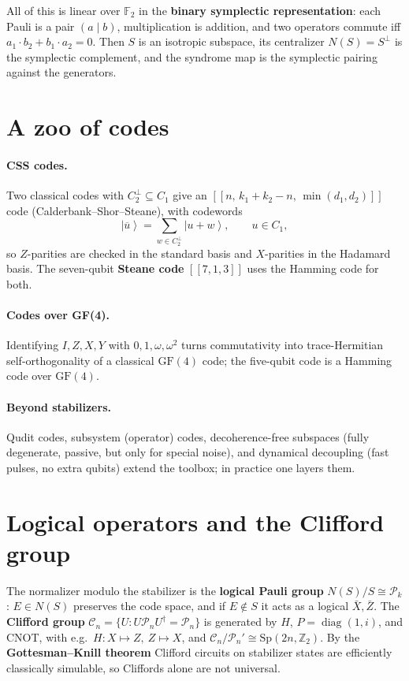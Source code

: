 \documentclass[11pt]{article}
\newcommand{\ket}[1]{\left|#1\right\rangle}
\DeclareMathOperator{\diag}{diag}
\theoremstyle{plain}
\begin{document}
\noindent All of this is linear over $\mathbb F_2$ in the \textbf{binary symplectic representation}:
each Pauli is a pair $(a\mid b)$, multiplication is addition, and two operators commute iff
$a_1\!\cdot\!b_2 + b_1\!\cdot\!a_2 = 0$. Then $S$ is an isotropic subspace, its centralizer
$N(S)=S^\perp$ is the symplectic complement, and the syndrome map is the symplectic pairing against
the generators.

\section{A zoo of codes}
\paragraph{CSS codes.} Two classical codes with $C_2^\perp\subseteq C_1$ give an
$[[n,\,k_1+k_2-n,\,\min(d_1,d_2)]]$ code (Calderbank--Shor--Steane), with codewords
\[ \ket{\overline{u}} = \sum_{w\in C_2^\perp}\ket{u+w},\qquad u\in C_1, \]
so $Z$-parities are checked in the standard basis and $X$-parities in the Hadamard basis. The
seven-qubit \textbf{Steane code} $[[7,1,3]]$ uses the Hamming code for both.

\paragraph{Codes over GF(4).} Identifying $I,Z,X,Y$ with $0,1,\omega,\omega^2$ turns commutativity into
trace-Hermitian self-orthogonality of a classical $\mathrm{GF}(4)$ code; the five-qubit code is a
Hamming code over $\mathrm{GF}(4)$.

\paragraph{Beyond stabilizers.} Qudit codes, subsystem (operator) codes, decoherence-free subspaces
(fully degenerate, passive, but only for special noise), and dynamical decoupling (fast pulses, no
extra qubits) extend the toolbox; in practice one layers them.

\section{Logical operators and the Clifford group}
The normalizer modulo the stabilizer is the \textbf{logical Pauli group} $N(S)/S \cong \mathcal P_k$:
$E\in N(S)$ preserves the code space, and if $E\notin S$ it acts as a logical $\bar X,\bar Z$. The
\textbf{Clifford group} $\mathcal C_n=\{U: U\mathcal P_n U^\dagger=\mathcal P_n\}$ is generated by $H$,
$P=\diag(1,i)$, and CNOT, with e.g.\ $H:X\mapsto Z,\ Z\mapsto X$, and
$\mathcal C_n/\mathcal P_n' \cong \mathrm{Sp}(2n,\mathbb Z_2)$. By the \textbf{Gottesman--Knill
theorem} Clifford circuits on stabilizer states are efficiently classically simulable, so Cliffords
alone are not universal.
\end{document}
